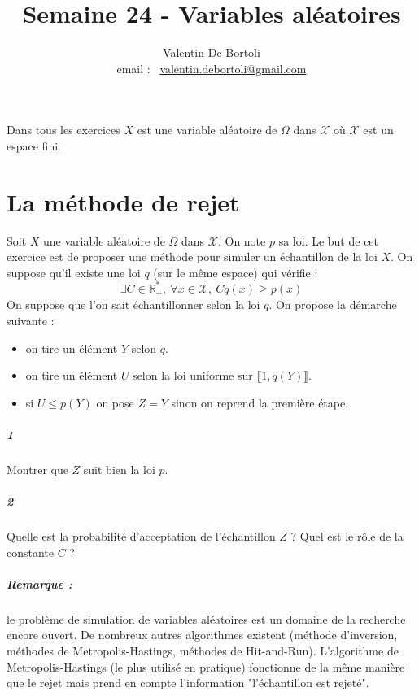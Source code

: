 \documentclass[10pt,a4paper]{article}
\title{Semaine 24 - Variables aléatoires}
\author{Valentin De Bortoli \\ email : \ \href{mailto:valentin.debortoli@gmail.com}{valentin.debortoli@gmail.com}}
\date{}
\begin{document}
\maketitle
Dans tous les exercices $X$ est une variable aléatoire de $\Omega$ dans $\mathcal{X}$ où $\mathcal{X}$ est un espace fini.
\section{La méthode de rejet}
Soit $X$ une variable aléatoire de $\Omega$ dans $\mathcal{X}$. On note $p$ sa loi.
Le but de cet exercice est de proposer une méthode pour simuler un échantillon de la loi $X$. On suppose qu'il existe une loi $q$ (sur le même espace) qui vérifie :
\begin{equation*}
\exists C \in \mathbb{R}_+^*, \ \forall x \in \mathcal{X}, \ Cq(x) \ge p(x)
\end{equation*}
On suppose que l'on sait échantillonner selon la loi $q$.
On propose la démarche suivante :
\begin{itemize}
\item on tire un élément $Y$ selon $q$.
\item on tire un élément $U$ selon la loi uniforme sur $\llbracket 1, q(Y) \rrbracket$.
\item si $U \le p(Y)$ on pose $Z=Y$ sinon on reprend la première étape.
\end{itemize}
\subparagraph{1}Montrer que $Z$ suit bien la loi $p$.
\subparagraph{2}Quelle est la probabilité d'acceptation de l'échantillon $Z$ ? Quel est le rôle de la constante $C$ ?
\subparagraph{Remarque :} le problème de simulation de variables aléatoires est un domaine de la recherche encore ouvert. De nombreux autres algorithmes existent (méthode d'inversion, méthodes de Metropolis-Hastings, méthodes de Hit-and-Run). L'algorithme de Metropolis-Hastings (le plus utilisé en pratique) fonctionne de la même manière que le rejet mais prend en compte l'information "l'échantillon est rejeté".
\end{document}
